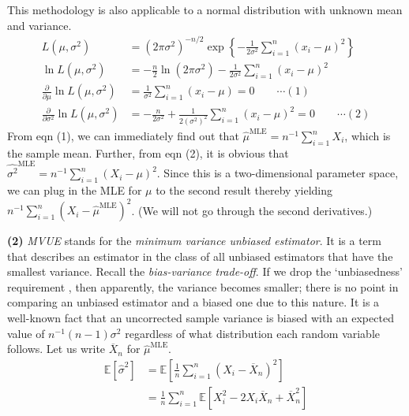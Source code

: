 \documentclass[answers]{exam}
\begin{document}
\begin{questions}
\begin{solution}
      This methodology is also applicable to a normal distribution with unknown mean and variance.
      \begin{align*}
         L\left(\mu, \sigma^{2}\right) &= \left(2\pi \sigma^{2} \right)^{-n/2}\exp \left\{-\frac{1}{2\sigma^{2}}\sum_{i=1}^{n}\left(x_{i}-\mu\right)^{2} \right\}\\
         \ln L\left(\mu, \sigma^{2}\right) &= -\frac{n}{2}\ln \left(2\pi\sigma^{2}\right) - \frac{1}{2\sigma^{2}}\sum_{i=1}^{n}\left(x_{i}-\mu\right)^{2}\\
         \frac{\partial}{\partial \mu}\ln L\left(\mu, \sigma^{2}\right) &= \frac{1}{\sigma^{2}}\sum_{i=1}^{n}\left(x_{i}-\mu\right) = 0 \qquad \cdots (1)\\
         \frac{\partial}{\partial \sigma^{2}}\ln L\left(\mu, \sigma^{2}\right) &= -\frac{n}{2\sigma^{2}} +\frac{1}{2\left(\sigma^{2}\right)^{2}}\sum_{i=1}^{n}\left(x_{i}-\mu\right)^{2} = 0 \qquad \cdots (2)
      \end{align*}
      From eqn (1), we can immediately find out that $\hat{\mu}^{\text{MLE}} = n^{-1}\sum_{i=1}^{n}X_{i}$, which is the sample mean. Further, from eqn (2), it is obvious that $\widehat{\sigma^{2}}^{\text{MLE}}=n^{-1}\sum_{i=1}^{n}\left(X_{i}-\mu\right)^{2}$. Since this is a two-dimensional parameter space, we can plug in the MLE for $\mu$ to the second result thereby yielding $n^{-1}\sum_{i=1}^{n}\left(X_{i} - \hat{\mu}^{\text{MLE}}\right)^{2}$. (We will not go through the second derivatives.)
   \end{solution}
   \begin{solution}
      \textbf{(2)} \emph{MVUE} stands for the \emph{minimum variance unbiased estimator}. It is a term that describes an estimator in the class of all unbiased estimators that have the smallest variance. Recall the \emph{bias-variance trade-off}. If we drop the `unbiasedness' requirement , then apparently, the variance becomes smaller; there is no point in comparing an unbiased estimator and a biased one due to this nature. It is a well-known fact that an uncorrected sample variance is biased with an expected value of $n^{-1}\left(n-1\right)\sigma^{2}$ regardless of what distribution each random variable follows. Let us write $\overline{X}_{n}$ for $\hat{\mu}^{\text{MLE}}$.
      \begin{align*}
         \mathbb{E}\left[\widehat{\sigma}^{2}\right] &= \mathbb{E}\left[\frac{1}{n}\sum_{i=1}^{n}\left(X_{i}-\overline{X}_{n}\right)^{2} \right]\\
         &= \frac{1}{n}\sum_{i=1}^{n}\mathbb{E}\left[X_{i}^{2} - 2X_{i}\overline{X}_{n} + \overline{X}_{n}^{2}  \right]\\

\end{align*}
\end{solution}
\end{questions}
\end{document}
